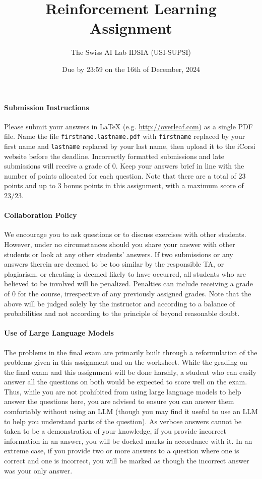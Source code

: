 \documentclass[a4paper,11pt]{article}
\author{The Swiss AI Lab IDSIA (USI-SUPSI)}
\title{Reinforcement Learning Assignment}
\date{Due by 23:59 on the 16th of December, 2024}
\begin{document}
\maketitle
\thispagestyle{fancy}

\paragraph{Submission Instructions}
Please submit your answers in {\LaTeX} (e.g. \url{http://overleaf.com}) as a single PDF file.
Name the file \texttt{firstname.lastname.pdf} with \texttt{firstname} replaced by your first name and \texttt{lastname} replaced by your last name, then upload it to the iCorsi website before the deadline.
Incorrectly formatted submissions and late submissions will receive a grade of $0$.
Keep your answers brief in line with the number of points allocated for each question.
Note that there are a total of $23$ points and up to $3$ bonus points in this assignment, with a maximum score of $23/23$.

\paragraph{Collaboration Policy}
We encourage you to ask questions or to discuss exercises with other students.
However, under no circumstances should you share your answer with other students or look at any other students' answers.
If two submissions or any answers therein are deemed to be too similar by the responsible TA, or plagiarism, or cheating is deemed likely to have occurred, all students who are believed to be involved will be penalized.
Penalties can include receiving a grade of $0$ for the course, irrespective of any previously assigned grades.
Note that the above will be judged solely by the instructor and according to a balance of probabilities and not according to the principle of beyond reasonable doubt.

\paragraph{Use of Large Language Models}
The problems in the final exam are primarily built through a reformulation of the problems given in this assignment and on the worksheet.
While the grading on the final exam and this assignment will be done harshly, a student who can easily answer all the questions on both would be expected to score well on the exam.
Thus, while you are not prohibited from using large language models to help answer the questions here, you are advised to ensure you can answer them comfortably without using an LLM (though you may find it useful to use an LLM to help you understand parts of the question).
As verbose answers cannot be taken to be a demonstration of your knowledge, if you provide incorrect information in an answer, you will be docked marks in accordance with it.
In an extreme case, if you provide two or more answers to a question where one is correct and one is incorrect, you will be marked as though the incorrect answer was your only answer.
\end{document}
